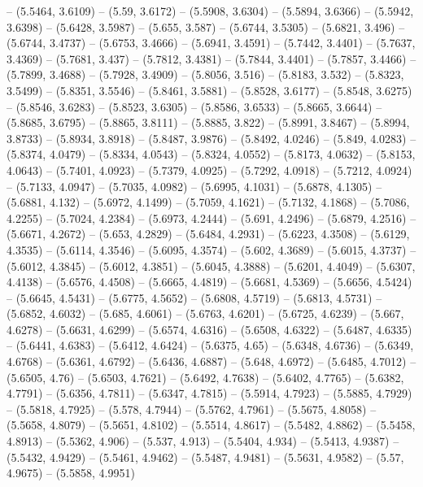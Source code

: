 {  -- (5.5464, 3.6109) -- (5.59, 3.6172) -- (5.5908, 3.6304) -- (5.5894, 3.6366) 
  -- (5.5942, 3.6398) -- (5.6428, 3.5987) -- (5.655, 3.587) -- (5.6744, 3.5305) 
  -- (5.6821, 3.496) -- (5.6744, 3.4737) -- (5.6753, 3.4666) -- (5.6941, 3.4591)
   -- (5.7442, 3.4401) -- (5.7637, 3.4369) -- (5.7681, 3.437) -- (5.7812, 
  3.4381) -- (5.7844, 3.4401) -- (5.7857, 3.4466) -- (5.7899, 3.4688) -- 
  (5.7928, 3.4909) -- (5.8056, 3.516) -- (5.8183, 3.532) -- (5.8323, 3.5499) -- 
  (5.8351, 3.5546) -- (5.8461, 3.5881) -- (5.8528, 3.6177) -- (5.8548, 3.6275) 
  -- (5.8546, 3.6283) -- (5.8523, 3.6305) -- (5.8586, 3.6533) -- (5.8665, 
  3.6644) -- (5.8685, 3.6795) -- (5.8865, 3.8111) -- (5.8885, 3.822) -- (5.8991,
   3.8467) -- (5.8994, 3.8733) -- (5.8934, 3.8918) -- (5.8487, 3.9876) -- 
  (5.8492, 4.0246) -- (5.849, 4.0283) -- (5.8374, 4.0479) -- (5.8334, 4.0543) --
   (5.8324, 4.0552) -- (5.8173, 4.0632) -- (5.8153, 4.0643) -- (5.7401, 4.0923) 
  -- (5.7379, 4.0925) -- (5.7292, 4.0918) -- (5.7212, 4.0924) -- (5.7133, 
  4.0947) -- (5.7035, 4.0982) -- (5.6995, 4.1031) -- (5.6878, 4.1305) -- 
  (5.6881, 4.132) -- (5.6972, 4.1499) -- (5.7059, 4.1621) -- (5.7132, 4.1868) --
   (5.7086, 4.2255) -- (5.7024, 4.2384) -- (5.6973, 4.2444) -- (5.691, 4.2496) 
  -- (5.6879, 4.2516) -- (5.6671, 4.2672) -- (5.653, 4.2829) -- (5.6484, 4.2931)
   -- (5.6223, 4.3508) -- (5.6129, 4.3535) -- (5.6114, 4.3546) -- (5.6095, 
  4.3574) -- (5.602, 4.3689) -- (5.6015, 4.3737) -- (5.6012, 4.3845) -- (5.6012,
   4.3851) -- (5.6045, 4.3888) -- (5.6201, 4.4049) -- (5.6307, 4.4138) -- 
  (5.6576, 4.4508) -- (5.6665, 4.4819) -- (5.6681, 4.5369) -- (5.6656, 4.5424) 
  -- (5.6645, 4.5431) -- (5.6775, 4.5652) -- (5.6808, 4.5719) -- (5.6813, 
  4.5731) -- (5.6852, 4.6032) -- (5.685, 4.6061) -- (5.6763, 4.6201) -- (5.6725,
   4.6239) -- (5.667, 4.6278) -- (5.6631, 4.6299) -- (5.6574, 4.6316) -- 
  (5.6508, 4.6322) -- (5.6487, 4.6335) -- (5.6441, 4.6383) -- (5.6412, 4.6424) 
  -- (5.6375, 4.65) -- (5.6348, 4.6736) -- (5.6349, 4.6768) -- (5.6361, 4.6792) 
  -- (5.6436, 4.6887) -- (5.648, 4.6972) -- (5.6485, 4.7012) -- (5.6505, 4.76) 
  -- (5.6503, 4.7621) -- (5.6492, 4.7638) -- (5.6402, 4.7765) -- (5.6382, 
  4.7791) -- (5.6356, 4.7811) -- (5.6347, 4.7815) -- (5.5914, 4.7923) -- 
  (5.5885, 4.7929) -- (5.5818, 4.7925) -- (5.578, 4.7944) -- (5.5762, 4.7961) --
   (5.5675, 4.8058) -- (5.5658, 4.8079) -- (5.5651, 4.8102) -- (5.5514, 4.8617) 
  -- (5.5482, 4.8862) -- (5.5458, 4.8913) -- (5.5362, 4.906) -- (5.537, 4.913) 
  -- (5.5404, 4.934) -- (5.5413, 4.9387) -- (5.5432, 4.9429) -- (5.5461, 4.9462)
   -- (5.5487, 4.9481) -- (5.5631, 4.9582) -- (5.57, 4.9675) -- (5.5858, 4.9951)
}
